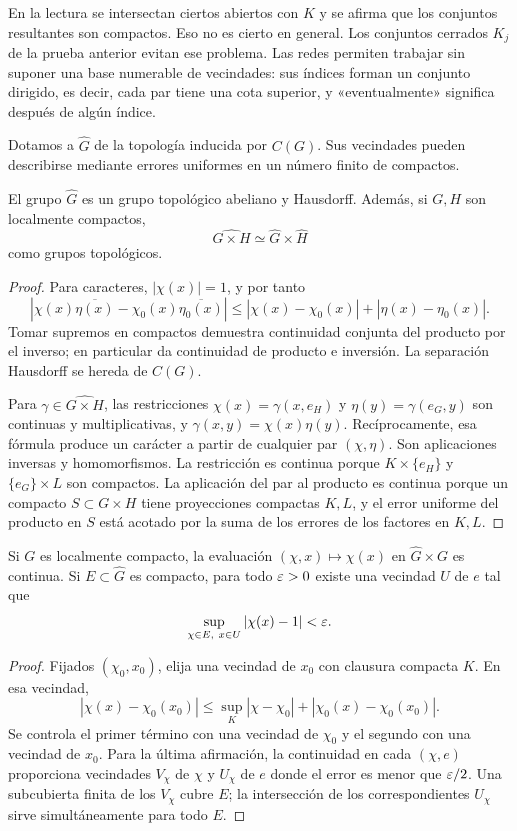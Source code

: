 En la lectura se intersectan ciertos abiertos con $K$ y se afirma que los conjuntos resultantes son compactos. Eso no es cierto en general. Los conjuntos cerrados $K_j$ de la prueba anterior evitan ese problema. Las redes permiten trabajar sin suponer una base numerable de vecindades: sus índices forman un conjunto dirigido, es decir, cada par tiene una cota superior, y «eventualmente» significa después de algún índice.

Dotamos a $\widehat G$ de la topología inducida por $C(G)$. Sus vecindades pueden describirse mediante errores uniformes en un número finito de compactos.
\begin{proposicion}\label{v4:dual-topologico}
El grupo $\widehat G$ es un grupo topológico abeliano y Hausdorff. Además, si $G,H$ son localmente compactos,
\[
 \widehat{G\times H}\simeq\widehat G\times\widehat H
\]
como grupos topológicos.
\end{proposicion}
\begin{proof}
Para caracteres, $|\chi(x)|=1$, y por tanto
\[
 |\chi(x)\overline{\eta(x)}-\chi_0(x)\overline{\eta_0(x)}|
 \le|\chi(x)-\chi_0(x)|+|\eta(x)-\eta_0(x)|.
\]
Tomar supremos en compactos demuestra continuidad conjunta del producto por el inverso; en particular da continuidad de producto e inversión. La separación Hausdorff se hereda de $C(G)$.

Para $\gamma\in\widehat{G\times H}$, las restricciones $\chi(x)=\gamma(x,e_H)$ y $\eta(y)=\gamma(e_G,y)$ son continuas y multiplicativas, y
$\gamma(x,y)=\chi(x)\eta(y)$. Recíprocamente, esa fórmula produce un carácter a partir de cualquier par $(\chi,\eta)$. Son aplicaciones inversas y homomorfismos. La restricción es continua porque $K\times\{e_H\}$ y $\{e_G\}\times L$ son compactos. La aplicación del par al producto es continua porque un compacto $S\subset G\times H$ tiene proyecciones compactas $K,L$, y el error uniforme del producto en $S$ está acotado por la suma de los errores de los factores en $K,L$.
\end{proof}

\begin{lema}\label{v4:dual-equicontinuidad}
Si $G$ es localmente compacto, la evaluación $(\chi,x)\mapsto\chi(x)$ en $\widehat G\times G$ es continua. Si $E\subset\widehat G$ es compacto, para todo $\varepsilon>0$ existe una vecindad $U$ de $e$ tal que
\[
 \sup_{\chi\in E,\ x\in U}|\chi(x)-1|<\varepsilon.
\]
\end{lema}
\begin{proof}
Fijados $(\chi_0,x_0)$, elija una vecindad de $x_0$ con clausura compacta $K$. En esa vecindad,
\[
 |\chi(x)-\chi_0(x_0)|\le\sup_K|\chi-\chi_0|+|\chi_0(x)-\chi_0(x_0)|.
\]
Se controla el primer término con una vecindad de $\chi_0$ y el segundo con una vecindad de $x_0$. Para la última afirmación, la continuidad en cada $(\chi,e)$ proporciona vecindades $V_\chi$ de $\chi$ y $U_\chi$ de $e$ donde el error es menor que $\varepsilon/2$. Una subcubierta finita de los $V_\chi$ cubre $E$; la intersección de los correspondientes $U_\chi$ sirve simultáneamente para todo $E$.
\end{proof}

